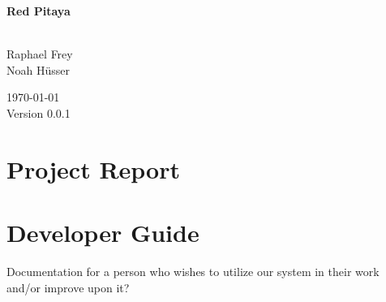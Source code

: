 \documentclass[a4paper,oneside]{alpenthesis/alpenthesis}
\begin{document}
\begin{titlingpage}
    \flushright\sffamily

    \vspace*{5em}
    \Huge\bfseries{Red Pitaya}\\[1ex]
    \Large{}\\[3ex]

    \normalsize\mdseries
    
    \vfill
    Raphael Frey\\
    Noah H\"usser\\[3ex]

    \vspace{5em}

    \today\\
    Version 0.0.1
\end{titlingpage} %

\frontmatter
\tableofcontents*
\clearpage
\listoffigures*
\clearpage
\listoftables*
\clearpage
\listoflistings
\clearpage

\mainmatter



\part{Project Report}
\label{part:project_report}


%


\part{Developer Guide}
\label{part:Developer_Guide}
Documentation for a person who wishes to utilize our system in their work and/or
improve upon it?
\end{document}
